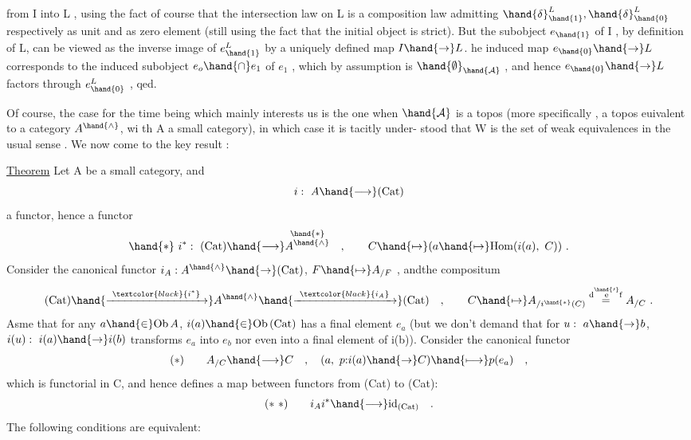 from I into L ,  using the fact of course that the intersection law on L
 is a composition law admitting $\hand{\delta}^{L}_{\hand{1}} ,\hand{\delta}^{L}_{\hand{0}}$ respectively as unit and
as zero element (still using the fact that the initial object is strict).
 But the subobject $e_{\hand{1}}$ of I ,  by definition of L,  can be viewed as the
 inverse image of $e^{L}_{\hand{1}}$ by a uniquely defined map $I \hand{\to} L$.  he induced
 map $e_{\hand{0}} \hand{\to} L$ corresponds to the induced subobject $e_{o}\hand{\cap} e_{1}$ of $e_{1}$ ,
which by assumption is $\hand{\emptyset}_{\hand{\mathcal{A}}}$ ,  and hence $e_{\hand{0}} \hand{\to} L$ factors through $e^{L}_{\hand{0}}$ ,  qed.

Of course,  the case for the time being which mainly interests us is
the one when $\hand{\mathcal{A}}$ is a topos (more specifically , a topos euivalent to a
category $A^{\hand{\wedge}}$, wi th A a small category),  in which case it is tacitly under-%
stood that W is the set of weak equivalences in the usual sense .  We now
come to the key result :

\uline{Theorem}  Let A be a small category,  and
\[ i:\ A \hand{\longrightarrow} (\mathrm{Cat}) \]
a functor,  hence a functor
\[ \hand{*}\ i^{*} :\ (\mathrm{Cat}) \hand{\longrightarrow} \overset{\hand{*}}{A^{\hand{\wedge}}} \quad ,\qquad C \hand{\mapsto} (a \hand{\mapsto} \mathrm{Hom}(i(a),\ C)) \ . \]
Consider the canonical functor  $i_{A} : A^{\hand{\wedge}} \hand{\to} (\mathrm{Cat})$,  $F \hand{\mapsto} A_{/F}$ ,  and\hand{/}the
compositum
\[ (\mathrm{Cat}) \hand{\xrightarrow{\ \textcolor{black}{i^{*}}\ }} A^{\hand{\wedge}} \hand{\xrightarrow{\ \textcolor{black}{i_{A}}\ }} (\mathrm{Cat}) \quad ,\qquad C \hand{\mapsto} A_{/i^{\hand{*}}(C)} \overset{\mathrm{d}\overset{\hand{\scriptscriptstyle\prime}}{\mathrm{e}}\mathrm{f}}{=} A_{/C} \ . \]
Asme that for any $a \hand{\in} \mathrm{Ob}\, A$,  $i(a) \hand{\in} \mathrm{Ob}\, (\mathrm{Cat})$ has a final element $e_{a}$ (but
we don't demand that for $u:\ a \hand{\to} b$,  $i(u):\ i(a) \hand{\to} i(b)$ transforms $e_{a}$ into
$e_{b}$ nor even into a final element of i(b)).  Consider the canonical
functor
\[ (*) \qquad A_{/C} \hand{\longrightarrow} C \quad , \quad (a,\ p{:}i(a) \hand{\to} C) \hand{\longmapsto} p(e_{a}) \quad , \]
which is functorial in C,  and hence defines a map between functors from
(Cat) to (Cat):
\[ (*\ *) \qquad i_{A}i^{*} \hand{\longrightarrow} \mathrm{id}_{(\mathrm{Cat})} \quad . \]
 The following conditions  are equivalent:

